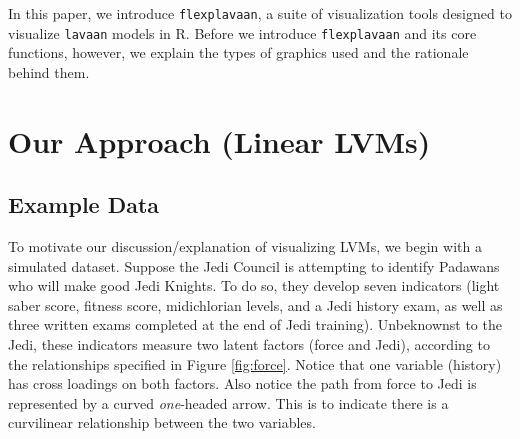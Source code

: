 \documentclass[
  english,
  doc]{apa6}
\begin{document}
In this paper, we introduce \texttt{flexplavaan}, a suite of visualization tools designed to visualize \texttt{lavaan} models in R. Before we introduce \texttt{flexplavaan} and its core functions, however, we explain the types of graphics used and the rationale behind them.

\hypertarget{our-approach-linear-lvms}{%
\section{Our Approach (Linear LVMs)}\label{our-approach-linear-lvms}}

\hypertarget{example-data}{%
\subsection{Example Data}\label{example-data}}

To motivate our discussion/explanation of visualizing LVMs, we begin with a simulated dataset. Suppose the Jedi Council is attempting to identify Padawans who will make good Jedi Knights. To do so, they develop seven indicators (light saber score, fitness score, midichlorian levels, and a Jedi history exam, as well as three written exams completed at the end of Jedi training). Unbeknownst to the Jedi, these indicators measure two latent factors (force and Jedi), according to the relationships specified in Figure \ref{fig:force}. Notice that one variable (history) has cross loadings on both factors. Also notice the path from force to Jedi is represented by a curved \emph{one}-headed arrow. This is to indicate there is a curvilinear relationship between the two variables.
\end{document}
